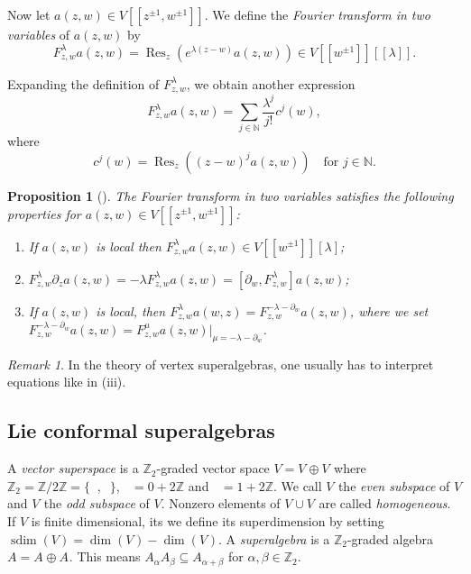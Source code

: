 \documentclass[a4paper, 12pt, reqno]{amsart}
\newtheorem{proposition}[theorem]{Proposition}
\theoremstyle{remark}
\newtheorem{remark}[theorem]{Remark}
\numberwithin{equation}{subsection}
\DeclareMathOperator{\Res}{Res}
\DeclareMathOperator{\zero}{\overline{0}}
\DeclareMathOperator{\one}{\overline{1}}
\DeclareMathOperator{\sdim}{sdim}
\begin{document}
Now let $a(z, w) \in V[[z^{\pm 1}, w^{\pm 1}]]$.
We define the \emph{Fourier transform in two variables} of $a(z, w)$ by
\begin{equation*}
  F^{\lambda}_{z, w}a(z, w) = \Res_z(e^{\lambda(z - w)}a(z, w)) \in V[[w^{\pm 1}]][[\lambda]].
\end{equation*}

Expanding the definition of $F^{\lambda}_{z, w}$, we obtain another expression
\begin{equation*}
  F^{\lambda}_{z, w}a(z, w) = \sum_{j \in \mathbb{N}}\frac{\lambda^j}{j!}c^j(w),
\end{equation*}
where
\begin{equation*}
  c^j(w) = \Res_z((z - w)^ja(z, w)) \quad \text{for }j \in \mathbb{N}.
\end{equation*}

\begin{proposition}[{\cite[Proposition 1.5.4]{nozaradan_introduction_2008}}]
  \label{prp:3}
  The Fourier transform in two variables satisfies the following properties for $a(z, w) \in V[[z^{\pm 1}, w^{\pm 1}]]$:
  \begin{enumerate}
  \item If $a(z, w)$ is local then $F^{\lambda}_{z, w}a(z, w) \in V[[w^{\pm 1}]][\lambda]$;
  \item $F^{\lambda}_{z, w}\partial_za(z, w) = -\lambda F^{\lambda}_{z, w}a(z, w) = [\partial_w, F^{\lambda}_{z, w}]a(z, w)$;
  \item If $a(z, w)$ is local, then $F^{\lambda}_{z, w}a(w, z) = F^{-\lambda - \partial_w}_{z, w}a(z, w)$, where we set $F^{-\lambda - \partial_w}_{z, w}a(z, w) = F^{\mu}_{z, w}a(z, w)|_{\mu = -\lambda - \partial_w}$.
  \end{enumerate}
\end{proposition}

\begin{remark}
  \label{rmk:1}
  In the theory of vertex superalgebras, one usually has to interpret equations like in (iii).
\end{remark}

\subsection{Lie conformal superalgebras}
\label{sec:lie-conf-super}

A \emph{vector superspace} is a $\mathbb{Z}_2$-graded vector space $V = V_{\zero} \oplus V_{\one}$ where $\mathbb{Z}_2 = \mathbb{Z}/2\mathbb{Z} = \{\zero, \one\}$, $\zero = 0 + 2\mathbb{Z}$ and $\one = 1 + 2\mathbb{Z}$.
We call $V_{\zero}$ the \emph{even subspace} of $V$ and $V_{\one}$ the \emph{odd subspace} of $V$.
Nonzero elements of $V_{\zero}\cup V_{\one}$ are called \emph{homogeneous}.
If $V$ is finite dimensional, its we define its superdimension by setting $\sdim(V) = \dim(V_{\zero}) - \dim(V_{\one})$.
A \emph{superalgebra} is a $\mathbb{Z}_2$-graded algebra $A = A_{\zero} \oplus A_{\one}$.
This means $A_{\alpha}A_{\beta} \subseteq A_{\alpha + \beta}$ for $\alpha, \beta \in \mathbb{Z}_2$.
\end{document}
